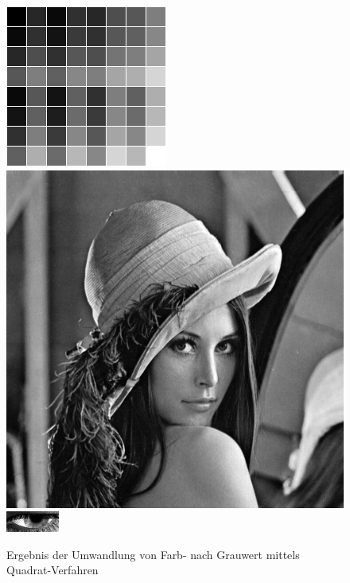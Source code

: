 \begin{figure}
	\centering
	\includegraphics[width=0.2\linewidth]{img/Farbkarte_Quadrat}
	\includegraphics[width=0.2\linewidth]{img/Lena_Quadrat}
	\includegraphics[width=0.2\linewidth]{img/Auge_QuadratGray}
	\caption{Ergebnis der Umwandlung von Farb- nach Grauwert mittels Quadrat-Verfahren}
	\label{img_Quadrat}
\end{figure}
